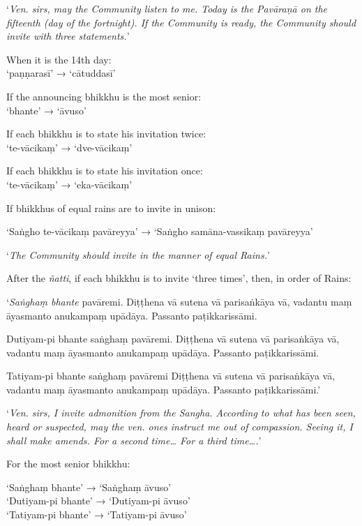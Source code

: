 ‘\emph{Ven. sirs, may the Community listen to me. Today is the Pavāraṇā on the
  fifteenth (day of the fortnight). If the Community is ready, the Community
  should invite with three statements.}’


When it is the 14th day:\\
‘paṇṇarasī’ → ‘cātuddasī’

If the announcing bhikkhu is the most senior:\\
‘bhante’ → ‘āvuso’

If each bhikkhu is to state his invitation twice:\\
‘te-vācikaṃ’ → ‘dve-vācikaṃ’

If each bhikkhu is to state his invitation once:\\
‘te-vācikaṃ’ → ‘eka-vācikaṃ’

If bhikkhus of equal rains are to invite in unison:

‘Saṅgho te-vācikaṃ pavāreyya’ → ‘Saṅgho samāna-vassikaṃ pavāreyya’

‘\emph{The Community should invite in the manner of equal Rains.}’

After the \emph{ñatti}, if each bhikkhu is to invite ‘three times’, then, in
order of Rains:

\vspace*{\parskip}

\begin{paritta}
‘\emph{Saṅghaṃ bhante} pavāremi. Diṭṭhena vā sutena vā parisaṅkāya vā, vadantu
maṃ āyasmanto anukampaṃ upādāya. Passanto paṭikkarissāmi.

Dutiyam-pi bhante saṅghaṃ pavāremi. Diṭṭhena vā sutena vā parisaṅkāya vā,
vadantu maṃ āyasmanto anukampaṃ upādāya. Passanto paṭikkarissāmi.

Tatiyam-pi bhante saṅghaṃ pavāremi Diṭṭhena vā sutena vā parisaṅkāya vā, vadantu
maṃ āyasmanto anukampaṃ upādāya. Passanto paṭikkarissāmi.’
\end{paritta}

‘\emph{Ven. sirs, I invite admonition from the Sangha. According to what has
  been seen, heard or suspected, may the ven. ones instruct me out of
  compassion. Seeing it, I shall make amends. For a second time… For a third
  time….}’

For the most senior bhikkhu:

‘Saṅghaṃ bhante’ → ‘Saṅghaṃ āvuso’\\
‘Dutiyam-pi bhante’ → ‘Dutiyam-pi āvuso’\\
‘Tatiyam-pi bhante’ → ‘Tatiyam-pi āvuso’

